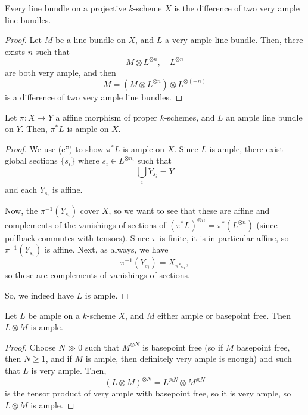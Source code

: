 \documentclass[12pt]{article}
\begin{document}
\begin{prop}
    Every line bundle on a projective $k$-scheme $X$ is the difference of two very ample line bundles.
\end{prop}

\begin{proof}
    Let $M$ be a line bundle on $X$, and $L$ a very ample line bundle. Then, there exists $n$ such that
    \[M\otimes L^{\otimes n}, \quad L^{\otimes n}\]
    are both very ample, and then
    \[M = (M\otimes L^{\otimes n}) \otimes L^{\otimes (-n)}\]
    is a difference of two very ample line bundles.
\end{proof}

\begin{prop}
    Let $\pi:X\to Y$ a affine morphism of proper $k$-schemes, and $L$ an ample line bundle on $Y$. Then, $\pi^* L$ is ample on $X$.
\end{prop}

\begin{proof}
    We use (c'') to show $\pi^* L$ is ample on $X$. Since $L$ is ample, there exist global sections $\{s_i\}$ where $s_i \in L^{\otimes n_i}$ such that
    \[\bigcup_i Y_{s_i} = Y\]
    and each $Y_{s_i}$ is affine.

    Now, the $\pi^{-1}(Y_{s_i})$ cover $X$, so we want to see that these are affine and complements of the vanishings of sections of $(\pi^* L)^{\otimes n} = \pi^*(L^{\otimes n})$ (since pullback commutes with tensors). Since $\pi$ is finite, it is in particular affine, so $\pi^{-1}(Y_{s_i})$ is affine. Next, as always, we have
    \[\pi^{-1}(Y_{s_i}) = X_{\pi^* s_i},\]
    so these are complements of vanishings of sections.

    So, we indeed have $L$ is ample.
\end{proof}

\begin{prop}
    Let $L$ be ample on a $k$-scheme $X$, and $M$ either ample or basepoint free. Then $L\otimes M$ is ample.
\end{prop}

\begin{proof}
    Choose $N\gg 0$ such that $M^{\otimes N}$ is basepoint free (so if $M$ basepoint free, then $N\geq 1$, and if $M$ is ample, then definitely very ample is enough) and such that $L$ is very ample. Then,
    \[(L\otimes M)^{\otimes N} = L^{\otimes N} \otimes M^{\otimes N}\]
    is the tensor product of very ample with basepoint free, so it is very ample, so $L\otimes M$ is ample.
\end{proof}
\end{document}
